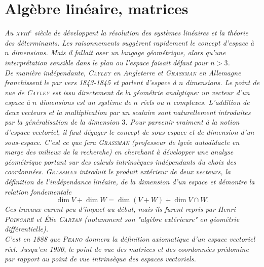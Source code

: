 \chapter{Algèbre linéaire, matrices}

\textsl{Au \textsc{xviii}$^e$ siècle de développent la résolution des systèmes linéaires et la théorie des déterminants. Les raisonnements suggèrent rapidement le concept d'espace à $n$ dimensions. Mais il fallait oser un langage géométrique, alors qu'une interprétation sensible dans le plan ou l'espace faisait défaut pour $n > 3$. \\
De manière indépendante, \textsc{Cayley} en Angleterre et \textsc{Grassman} en Allemagne franchissent le par vers 1843-1845 et parlent d'espace à $n$ dimensions. Le point de vue de \textsc{Cayley} est issu directement de la géométrie analytique: un vecteur d'un espace à $n$ dimensions est un système de $n$ réels ou $n$ complexes. L'addition de deux vecteurs et la multiplication par un scalaire sont naturellement introduites par la généralisation de la dimension $3$. Pour parvenir vraiment à la notion d'espace vectoriel, il faut dégager le concept de sous-espace et de dimension d'un sous-espace. C'est ce que fera \textsc{Grassman} (professeur de lycée autodidacte en marge des milieux de la recherche) en cherchant à développer une analyse géométrique portant sur des calculs intrinsèques indépendants du choix des coordonnées. \textsc{Grassman} introduit le produit extérieur de deux vecteurs, la définition de l'indépendance linéaire, de la dimension d'un espace et démontre la relation fondementale
$$\dim V + \dim W = \dim (V + W) + \dim V \cap W.$$
Ces travaux eurent peu d'impact au début, mais ils furent repris par Henri \textsc{Poincaré} et Élie \textsc{Cartan} (notamment son "algèbre extérieure" en géométrie différentielle). \\
C'est en 1888 que \textsc{Peano} donnera la définition axiomatique d'un espace vectoriel réel. Jusqu'en 1930, le point de vue des matrices et des coordonnées prédomine par rapport au point de vue intrinsèque des espaces vectoriels.
}

